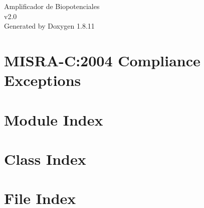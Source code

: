 \documentclass[twoside]{book}
\newcommand{\+}{\discretionary{\mbox{\scriptsize$\hookleftarrow$}}{}{}}
\newcommand{\clearemptydoublepage}{%
  \newpage{\pagestyle{empty}\cleardoublepage}%
}
\begin{document}
\hypersetup{pageanchor=false,
             bookmarksnumbered=true,
             pdfencoding=unicode
            }
\begin{titlepage}
\vspace*{7cm}
\begin{center}%
{\Large Amplificador de Biopotenciales \\[1ex]\large v2.\+0 }\\
\vspace*{1cm}
{\large Generated by Doxygen 1.8.11}\\
\end{center}
\end{titlepage}
\clearemptydoublepage
\tableofcontents
\clearemptydoublepage
{}
\hypersetup{pageanchor=true}

\chapter{M\+I\+S\+R\+A-\/C\+:2004 Compliance Exceptions}
\label{CMSIS_MISRA_Exceptions}
\hypertarget{CMSIS_MISRA_Exceptions}{}

\chapter{Module Index}

\chapter{Class Index}

\chapter{File Index}

\end{document}
